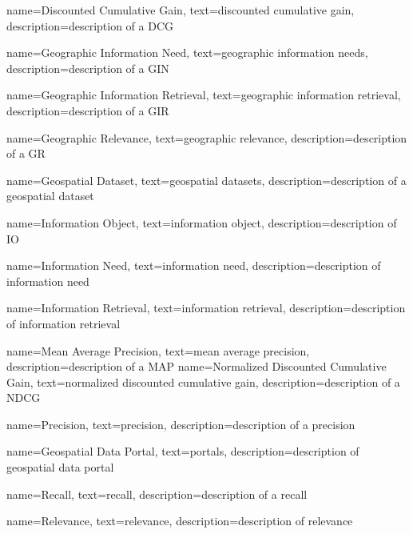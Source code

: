 
{
    name=Discounted Cumulative Gain,
    text=discounted cumulative gain,
    description=description of a DCG
}

{
    name=Geographic Information Need,
    text=geographic information needs,
    description=description of a GIN
}

{
    name=Geographic Information Retrieval,
    text=geographic information retrieval,
    description=description of a GIR
}

{
    name=Geographic Relevance,
    text=geographic relevance,
    description=description of a GR
}

{
    name=Geospatial Dataset,
    text=geospatial datasets,
    description=description of a geospatial dataset
}

{
    name=Information Object,
    text=information object,
    description=description of IO
}

{
    name=Information Need,
    text=information need,
    description=description of information need
}

{
    name=Information Retrieval,
    text=information retrieval,
    description=description of information retrieval
}

{
    name=Mean Average Precision,
    text=mean average precision,
    description=description of a MAP
}
{
    name=Normalized Discounted Cumulative Gain,
    text=normalized discounted cumulative gain,
    description=description of a NDCG
}

{
    name=Precision,
    text=precision,
    description=description of a precision
}

{
    name=Geospatial Data Portal,
    text=portals,
    description=description of geospatial data portal
}

{
    name=Recall,
    text=recall,
    description=description of a recall
}

{
    name=Relevance,
    text=relevance,
    description=description of relevance
}